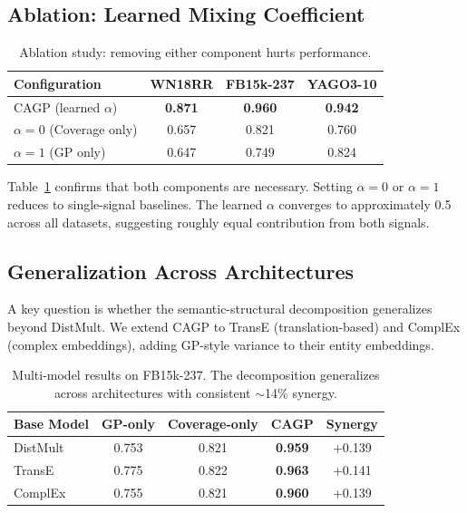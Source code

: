 \subsection{Ablation: Learned Mixing Coefficient}

\begin{table}[t]
\centering
\caption{Ablation study: removing either component hurts performance.}
\label{tab:ablation}
\vspace{0.5em}
\begin{tabular}{lccc}
\toprule
Configuration & WN18RR & FB15k-237 & YAGO3-10 \\
\midrule
CAGP (learned $\alpha$) & \textbf{0.871} & \textbf{0.960} & \textbf{0.942} \\
$\alpha = 0$ (Coverage only) & 0.657 & 0.821 & 0.760 \\
$\alpha = 1$ (GP only) & 0.647 & 0.749 & 0.824 \\
\bottomrule
\end{tabular}
\end{table}

Table~\ref{tab:ablation} confirms that both components are necessary.
Setting $\alpha = 0$ or $\alpha = 1$ reduces to single-signal baselines.
The learned $\alpha$ converges to approximately 0.5 across all datasets, suggesting roughly equal contribution from both signals.

\subsection{Generalization Across Architectures}

A key question is whether the semantic-structural decomposition generalizes beyond DistMult.
We extend CAGP to TransE (translation-based) and ComplEx (complex embeddings), adding GP-style variance to their entity embeddings.

\begin{table}[t]
\centering
\caption{Multi-model results on FB15k-237. The decomposition generalizes across architectures with consistent $\sim$14\% synergy.}
\label{tab:multimodel}
\vspace{0.5em}
\begin{tabular}{lcccc}
\toprule
Base Model & GP-only & Coverage-only & CAGP & Synergy \\
\midrule
DistMult & 0.753 & 0.821 & \textbf{0.959} & +0.139 \\
TransE & 0.775 & 0.822 & \textbf{0.963} & +0.141 \\
ComplEx & 0.755 & 0.821 & \textbf{0.960} & +0.139 \\
\bottomrule
\end{tabular}
\end{table}

